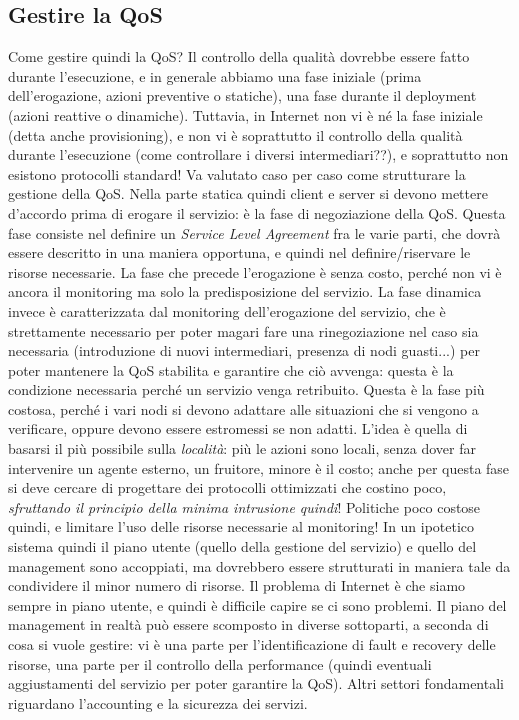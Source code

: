 \subsection{Gestire la QoS}
Come gestire quindi la QoS? Il controllo della qualità dovrebbe essere fatto durante l'esecuzione, e in generale
abbiamo una fase iniziale (prima dell'erogazione, azioni preventive o statiche), una fase durante il deployment
(azioni reattive o dinamiche). Tuttavia, in Internet non vi è né la fase iniziale (detta anche provisioning), e non
vi è soprattutto il controllo della qualità durante l'esecuzione (come controllare i diversi intermediari??), e
soprattutto non esistono protocolli standard! Va valutato caso per caso come strutturare la gestione della QoS.
Nella parte statica quindi client e server si devono mettere d'accordo prima di erogare il servizio: è la fase di
negoziazione della QoS. Questa fase consiste nel definire un \textit{Service Level Agreement} fra le varie parti,
che dovrà essere descritto in una maniera opportuna, e quindi nel definire/riservare le risorse necessarie. La fase
che precede l'erogazione è senza costo, perché non vi è ancora il monitoring ma solo la predisposizione del servizio.
La fase dinamica invece è caratterizzata dal monitoring dell'erogazione del servizio, che è strettamente necessario
per poter magari fare una rinegoziazione nel caso sia necessaria (introduzione di nuovi intermediari, presenza di
nodi guasti...) per poter mantenere la QoS stabilita e garantire che ciò avvenga: questa è la condizione necessaria
perché un servizio venga retribuito. Questa è la fase più costosa, perché i vari nodi si devono adattare alle
situazioni che si vengono a verificare, oppure devono essere estromessi se non adatti. L'idea è quella di basarsi il
più possibile sulla \textit{località}: più le azioni sono locali, senza dover far intervenire un agente esterno, un
fruitore, minore è il costo; anche per questa fase si deve cercare di progettare dei protocolli ottimizzati che
costino poco, \textit{sfruttando il principio della minima intrusione quindi}! Politiche poco costose quindi, e
limitare l'uso delle risorse necessarie al monitoring! In un ipotetico sistema quindi il piano utente (quello della
gestione del servizio) e quello del management sono accoppiati, ma dovrebbero essere strutturati in maniera tale da
condividere il minor numero di risorse. Il problema di Internet è che siamo sempre in piano utente, e quindi è
difficile capire se ci sono problemi.
Il piano del management in realtà può essere scomposto in diverse sottoparti, a seconda di cosa si vuole gestire: vi
è una parte per l'identificazione di fault e recovery delle risorse, una parte per il controllo della performance
(quindi eventuali aggiustamenti del servizio per poter garantire la QoS). Altri settori fondamentali riguardano
l'accounting e la sicurezza dei servizi.

